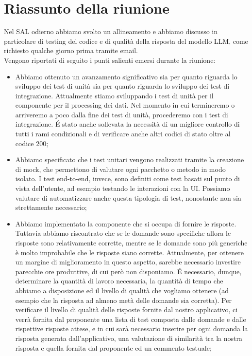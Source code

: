 \section{Riassunto della riunione}
Nel SAL odierno abbiamo svolto un allineamento e abbiamo discusso in particolare di testing del codice e di qualità della risposta del modello LLM, come richiesto qualche giorno prima tramite email. \\
Vengono riportati di seguito i punti salienti emersi durante la riunione:
\begin{itemize}
    \item Abbiamo ottenuto un avanzamento significativo sia per quanto riguarda lo sviluppo dei test di unità sia per quanto riguarda lo sviluppo dei test di integrazione. Attualmente stiamo sviluppando i test di unità per il componente per il processing dei dati. Nel momento in cui termineremo o arriveremo a poco dalla fine dei test di unità, procederemo con i test di integrazione. \'E stato anche sollevata la necessità di un migliore controllo di tutti i rami condizionali e di verificare anche altri codici di stato oltre al codice 200;
    \item Abbiamo specificato che i test unitari vengono realizzati tramite la creazione di mock, che permettono di valutare ogni pacchetto o metodo in modo isolato. I test end-to-end, invece, sono definiti come test basati sul punto di vista dell'utente, ad esempio testando le interazioni con la UI. Possiamo valutare di automatizzare anche questa tipologia di test, nonostante non sia strettamente necessario;
    \item Abbiamo implementato la componente che si occupa di fornire le risposte. Tuttavia abbiamo riscontrato che se le domande sono specifiche allora le risposte sono relativamente corrette, mentre se le domande sono più generiche è molto improbabile che le risposte siano corrette. Attualmente, per ottenere un margine di miglioramento in questo aspetto, sarebbe necessario investire parecchie ore produttive, di cui però non disponiamo. \'E necessario, dunque, determinare la quantità di lavoro necessaria, la quantità di tempo che abbiamo a disposizione ed il livello di qualità che vogliamo ottenere (ad esempio che la risposta ad almeno metà delle domande sia corretta). Per verificare il livello di qualità delle risposte fornite dal nostro applicativo, ci verrà fornita dal proponente una lista di test composta dalle domande e dalle rispettive risposte attese, e in cui sarà necessario inserire per ogni domanda la risposta generata dall'applicativo, una valutazione di similarità tra la nostra risposta e quella fornita dal proponente ed un commento testuale;

\end{itemize}
